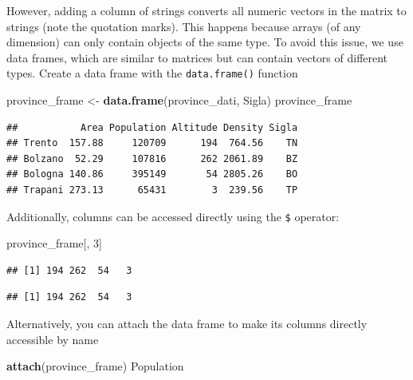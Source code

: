\documentclass[
]{article}
\newenvironment{Shaded}{\begin{snugshade}}{\end{snugshade}}
\newcommand{\DecValTok}[1]{\textcolor[rgb]{0.00,0.00,0.81}{#1}}
\newcommand{\FunctionTok}[1]{\textcolor[rgb]{0.13,0.29,0.53}{\textbf{#1}}}
\newcommand{\NormalTok}[1]{#1}
\newcommand{\OtherTok}[1]{\textcolor[rgb]{0.56,0.35,0.01}{#1}}
\newcommand{\SpecialCharTok}[1]{\textcolor[rgb]{0.81,0.36,0.00}{\textbf{#1}}}
\begin{document}
However, adding a column of strings converts all numeric vectors in the
matrix to strings (note the quotation marks). This happens because
arrays (of any dimension) can only contain objects of the same type. To
avoid this issue, we use data frames, which are similar to matrices but
can contain vectors of different types. Create a data frame with the
\texttt{data.frame()} function

\begin{Shaded}
\begin{Highlighting}[]
\NormalTok{province\_frame }\OtherTok{\textless{}{-}} \FunctionTok{data.frame}\NormalTok{(province\_dati, Sigla)}
\NormalTok{province\_frame}
\end{Highlighting}
\end{Shaded}

\begin{verbatim}
##           Area Population Altitude Density Sigla
## Trento  157.88     120709      194  764.56    TN
## Bolzano  52.29     107816      262 2061.89    BZ
## Bologna 140.86     395149       54 2805.26    BO
## Trapani 273.13      65431        3  239.56    TP
\end{verbatim}

Additionally, columns can be accessed directly using the \texttt{\$}
operator:

\begin{Shaded}
\begin{Highlighting}[]
\NormalTok{province\_frame[, }\DecValTok{3}\NormalTok{]}
\end{Highlighting}
\end{Shaded}

\begin{verbatim}
## [1] 194 262  54   3
\end{verbatim}

\begin{Shaded}
\end{Shaded}

\begin{verbatim}
## [1] 194 262  54   3
\end{verbatim}

Alternatively, you can attach the data frame to make its columns
directly accessible by name

\begin{Shaded}
\begin{Highlighting}[]
\FunctionTok{attach}\NormalTok{(province\_frame)}
\NormalTok{Population}
\end{Highlighting}
\end{Shaded}
\end{document}
